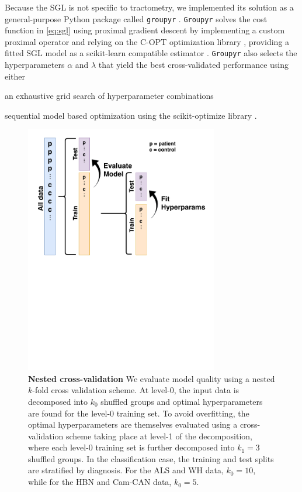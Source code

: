 \documentclass[10pt,letterpaper]{article}
\begin{document}
Because the SGL is not specific to tractometry, we implemented its solution as
a general-purpose Python package called \texttt{groupyr} \cite{groupyr}.
\texttt{Groupyr} solves the cost function in \cref{eq:sgl} using proximal
gradient descent \cite{parikh2014proximal} by implementing a custom proximal
operator and relying on the C-OPT optimization library \cite{copt}, providing
a fitted SGL model as a scikit-learn compatible estimator \cite{sklearn_api}.
\texttt{Groupyr} also selects the hyperparameters $\alpha$ and $\lambda$ that
yield the best cross-validated performance using either
\begin{enumerate*}[%
    label=(\roman*),%
    before=\unskip{: },%
    itemjoin={{, }},%
    itemjoin*={{, or }}]
    \item an exhaustive grid search of hyperparameter combinations
    \item sequential model based optimization using the scikit-optimize
    library \cite{scikit_optimize}.
\end{enumerate*}

\begin{figure}[t]
    \includegraphics[width=0.75\textwidth]{nested-cross-validation.pdf}
    \caption{{\bf Nested cross-validation}
        \label{fig:nested-cross-val}
        We evaluate model quality using a nested $k$-fold cross validation
        scheme. At level-0, the input data is decomposed into $k_0$ shuffled
        groups and optimal hyperparameters are found for the level-0 training
        set. To avoid overfitting, the optimal hyperparameters are themselves
        evaluated using a cross-validation scheme taking place at level-1 of
        the decomposition, where each level-0 training set is further
        decomposed into $k_1 = 3$ shuffled groups. In the classification
        case, the training and test splits are stratified by diagnosis. For
        the ALS and WH data, $k_0 = 10$, while for the HBN and Cam-CAN data,
        $k_0 = 5$.
    }
\end{figure}
\end{document}
